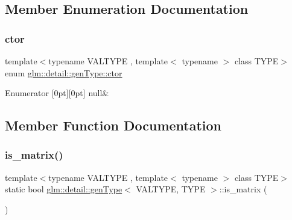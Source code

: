 \subsection{Member Enumeration Documentation}
\mbox{\label{structglm_1_1detail_1_1gen_type_a67fe8a1e8d43ab9e9151868ed277be94}} 
\subsubsection{\texorpdfstring{ctor}{ctor}}
{\footnotesize\ttfamily template$<$typename V\+A\+L\+T\+Y\+PE , template$<$ typename $>$ class T\+Y\+PE$>$ \\
enum \hyperlink{structglm_1_1detail_1_1gen_type_a67fe8a1e8d43ab9e9151868ed277be94}{glm\+::detail\+::gen\+Type\+::ctor}}

\begin{DoxyEnumFields}{Enumerator}
[0pt][0pt]{}\mbox{\label{structglm_1_1detail_1_1gen_type_a67fe8a1e8d43ab9e9151868ed277be94a95dbe65e3036a53702aa8c21f040d753}} 
null&\\
\hline

\end{DoxyEnumFields}


\subsection{Member Function Documentation}
\mbox{\label{structglm_1_1detail_1_1gen_type_a78c650375558d5e2ccfba383cdb59479}} 
\subsubsection{\texorpdfstring{is\+\_\+matrix()}{is\_matrix()}}
{\footnotesize\ttfamily template$<$typename V\+A\+L\+T\+Y\+PE , template$<$ typename $>$ class T\+Y\+PE$>$ \\
static bool \hyperlink{structglm_1_1detail_1_1gen_type}{glm\+::detail\+::gen\+Type}$<$ V\+A\+L\+T\+Y\+PE, T\+Y\+PE $>$\+::is\+\_\+matrix (\begin{DoxyParamCaption}{ }\end{DoxyParamCaption})\hspace{0.3cm}{\ttfamily [static]}}

